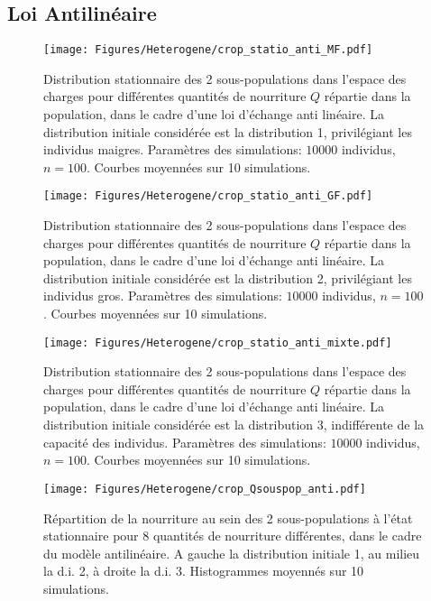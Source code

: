 \clearpage

\subsection{Loi Antilinéaire}

\begin{figure}[h!]
\centering
\texttt{[image: Figures/Heterogene/crop\_statio\_anti\_MF.pdf]}
\caption{Distribution stationnaire des 2 sous-populations dans l'espace des charges pour différentes quantités de nourriture $Q$ répartie dans la population, dans le cadre d'une loi d'échange anti linéaire. La distribution initiale considérée est la distribution 1, privilégiant les individus maigres. Paramètres des simulations: $10000$ individus, $n=100$. Courbes moyennées sur 10 simulations.}
\label{statio_anti_MF}
\end{figure}

\begin{figure}[h!]
\centering
\texttt{[image: Figures/Heterogene/crop\_statio\_anti\_GF.pdf]}
\caption{Distribution stationnaire des 2 sous-populations dans l'espace des charges pour différentes quantités de nourriture $Q$ répartie dans la population, dans le cadre d'une loi d'échange anti linéaire. La distribution initiale considérée est la distribution 2, privilégiant les individus gros. Paramètres des simulations: $10000$ individus, $n=100$. Courbes moyennées sur 10 simulations.}
\label{statio_anti_GF}
\end{figure}

\begin{figure}[h!]
\centering
\texttt{[image: Figures/Heterogene/crop\_statio\_anti\_mixte.pdf]}
\caption{Distribution stationnaire des 2 sous-populations dans l'espace des charges pour différentes quantités de nourriture $Q$ répartie dans la population, dans le cadre d'une loi d'échange anti linéaire. La distribution initiale considérée est la distribution 3, indifférente de la capacité des individus. Paramètres des simulations: $10000$ individus, $n=100$. Courbes moyennées sur 10 simulations.}
\label{statio_anti_mixte}
\end{figure}


\begin{figure}[h!]
\centering
\texttt{[image: Figures/Heterogene/crop\_Qsouspop\_anti.pdf]}
\caption{Répartition de la nourriture au sein des 2 sous-populations à l'état stationnaire pour 8 quantités de nourriture différentes, dans le cadre du modèle antilinéaire. A gauche la distribution initiale 1, au milieu la d.i. 2, à droite la d.i. 3. Histogrammes moyennés sur 10 simulations.}
\label{Qsouspop_anti}
\end{figure}

